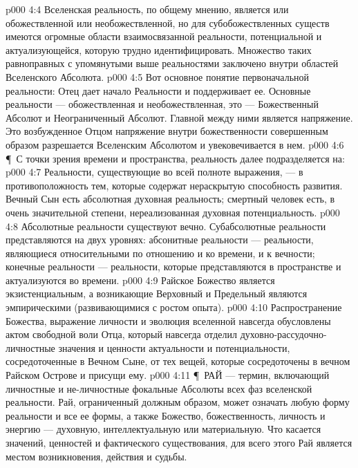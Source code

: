 \vs p000 4:4 \bibnobreakspace {} Вселенская реальность, по общему мнению, является или обожествленной или необожествленной, но для субобожествленных существ имеются огромные области взаимосвязанной реальности, потенциальной и актуализующейся, которую трудно идентифицировать. Множество таких равноправных с упомянутыми выше реальностями заключено внутри областей Вселенского Абсолюта.
\vs p000 4:5 Вот основное понятие первоначальной реальности: Отец дает начало Реальности и поддерживает ее. Основные  реальности --- обожествленная и необожествленная, это --- Божественный Абсолют и Неограниченный Абсолют. Главной  между ними является напряжение. Это возбужденное Отцом напряжение внутри божественности совершенным образом разрешается Вселенским Абсолютом и увековечивается в нем.
\vs p000 4:6 \P\ С точки зрения времени и пространства, реальность далее подразделяется на:
\vs p000 4:7 \bibnobreakspace {} Реальности, существующие во всей полноте выражения, --- в противоположность тем, которые содержат нераскрытую способность развития. Вечный Сын есть абсолютная духовная реальность; смертный человек есть, в очень значительной степени, нереализованная духовная потенциальность.
\vs p000 4:8 \bibnobreakspace {} Абсолютные реальности существуют вечно. Субабсолютные реальности представляются на двух уровнях: абсонитные реальности --- реальности, являющиеся относительными по отношению и ко времени, и к вечности; конечные реальности --- реальности, которые представляются в пространстве и актуализуются во времени.
\vs p000 4:9 \bibnobreakspace {} Райское Божество является экзистенциальным, а возникающие Верховный и Предельный являются эмпирическими (развивающимися с ростом опыта).
\vs p000 4:10 \bibnobreakspace {} Распространение Божества, выражение личности и эволюция вселенной навсегда обусловлены актом свободной воли Отца, который навсегда отделил духовно\hyp{}рассудочно\hyp{}личностные значения и ценности актуальности и потенциальности, сосредоточенные в Вечном Сыне, от тех вещей, которые сосредоточены в вечном Райском Острове и присущи ему.
\vs p000 4:11 \P\ РАЙ --- термин, включающий личностные и не\hyp{}личностные фокальные Абсолюты всех фаз вселенской реальности. Рай, ограниченный должным образом, может означать любую форму реальности и все ее формы, а также Божество, божественность, личность и энергию --- духовную, интеллектуальную или материальную. Что касается значений, ценностей и фактического существования, для всего этого Рай является местом возникновения, действия и судьбы.
